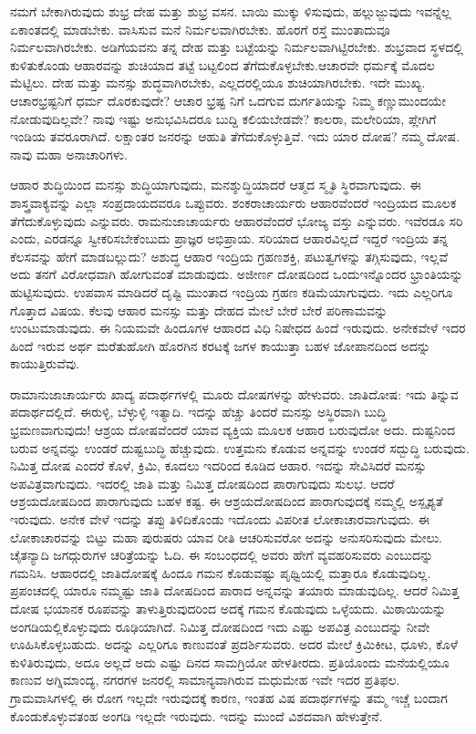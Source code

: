 ನಮಗೆ ಬೇಕಾಗಿರುವುದು ಶುಭ್ರ ದೇಹ ಮತ್ತು ಶುಭ್ರ ವಸನ. ಬಾಯಿ ಮುಕ್ಕು ಳಿಸುವುದು, ಹಲ್ಲುಜ್ಜುವುದು ಇವನ್ನೆಲ್ಲ ಏಕಾಂತದಲ್ಲಿ ಮಾಡಬೇಕು. ವಾಸಿಸುವ ಮನೆ ನಿರ್ಮಲವಾಗಿರಬೇಕು. ಹೊರಗೆ ರಸ್ತೆ ಮುಂತಾದುವೂ ನಿರ್ಮಲವಾಗಿರಬೇಕು. ಅಡಿಗೆ\break ಯವನು ತನ್ನ ದೇಹ ಮತ್ತು ಬಟ್ಟೆಯನ್ನು ನಿರ್ಮಲವಾಗಿಟ್ಟಿರಬೇಕು. ಶುಭ್ರವಾದ ಸ್ಥಳದಲ್ಲಿ ಕುಳಿತುಕೊಂಡು ಆಹಾರವನ್ನು ಶುಚಿಯಾದ ತಟ್ಟೆ ಬಟ್ಟಲಿಂದ ತೆಗೆದುಕೊಳ್ಳಬೇಕು.ಆಚಾರವೇ ಧರ್ಮಕ್ಕೆ ಮೊದಲ ಮೆಟ್ಟಿಲು. ದೇಹ ಮತ್ತು ಮನಸ್ಸು ಶುದ್ಧವಾಗಿರಬೇಕು, ಎಲ್ಲದರಲ್ಲಿಯೂ ಶುಚಿಯಾಗಿರಬೇಕು. ಇದೇ ಮುಖ್ಯ. ಆಚಾರಭ್ರಷ್ಟನಿಗೆ ಧರ್ಮ ದೊರಕುವುದೇ? ಆಚಾರ ಭ್ರಷ್ಟ ನಿಗೆ ಒದಗುವ ದುರ್ಗತಿಯನ್ನು ನಿಮ್ಮ ಕಣ್ಣುಮುಂದಯೇ ನೋಡುವುದಿಲ್ಲವೇ? ನಾವು ಇಷ್ಟು ಅನುಭವಿಸಿದರೂ ಬುದ್ದಿ ಕಲಿಯಬೇಡವೇ? ಕಾಲರಾ, ಮಲೇರಿಯಾ, ಪ್ಲೇಗಿಗೆ ಇಂಡಿಯ ತವರೂರಾಗಿದೆ. ಲಕ್ಷಾಂತರ ಜನರನ್ನು ಆಹುತಿ ತೆಗೆದುಕೊಳ್ಳುತ್ತಿವೆ. ಇದು ಯಾರ ದೋಷ? ನಮ್ಮ ದೋಷ. ನಾವು ಮಹಾ ಅನಾಚಾರಿಗಳು.

ಆಹಾರ ಶುದ್ಧಿಯಿಂದ ಮನಸ್ಸು ಶುದ್ಧಿಯಾಗುವುದು, ಮನಶ್ಶುದ್ಧಿಯಾದರೆ ಆತ್ಮದ ಸ್ಮೃತಿ ಸ್ಥಿರವಾಗುವುದು. ಈ ಶಾಸ್ತ್ರವಾಕ್ಯವನ್ನು ಎಲ್ಲಾ ಸಂಪ್ರದಾಯದವರೂ ಒಪ್ಪುವರು.\- ಶಂಕರಾಚಾರ್ಯರು ಆಹಾರವೆಂದರೆ ಇಂದ್ರಿಯದ ಮೂಲಕ ತೆಗೆದುಕೊಳ್ಳುವುದು ಎನ್ನುವರು. ರಾಮನುಜಾಚಾರ್ಯರು ಆಹಾರವೆಂದರೆ ಭೋಜ್ಯ ವಸ್ತು ಎನ್ನುವರು. ಇವೆರಡೂ ಸರಿ ಎಂದು, ಎರಡನ್ನೂ ಸ್ವೀಕರಿಸಬೇಕೆಂಬುದು ಪ್ರಾಜ್ಞರ ಅಭಿಪ್ರಾಯ. ಸರಿಯಾದ ಆಹಾರವಿಲ್ಲದೆ ಇದ್ದರೆ ಇಂದ್ರಿಯ ತನ್ನ ಕೆಲಸವನ್ನು ಹೇಗೆ ಮಾಡಬಲ್ಲುದು? ಅಶುದ್ಧ ಆಹಾರ ಇಂದ್ರಿಯ ಗ್ರಹಣಶಕ್ತಿ, ಪಟುತ್ವಗಳನ್ನು ತಗ್ಗಿಸುವುದು, ಇಲ್ಲವೆ ಅದು ತನಗೆ ವಿರೋಧವಾಗಿ ಹೋಗುವಂತೆ ಮಾಡುವುದು. ಅಜೀರ್ಣ ದೋಷದಿಂದ ಒಂದು\break ಇನ್ನೊಂದರ ಭ್ರಾಂತಿಯನ್ನು ಹುಟ್ಟಿಸುವುದು. ಉಪವಾಸ ಮಾಡಿದರೆ ದೃಷ್ಟಿ ಮುಂತಾದ ಇಂದ್ರಿಯ ಗ್ರಹಣ ಕಡಿಮೆಯಾಗುವುದು. ಇದು ಎಲ್ಲರಿಗೂ ಗೊತ್ತಾದ ವಿಷಯ. ಕೆಲವು ಆಹಾರ ಮನಸ್ಸು ಮತ್ತು ದೇಹದ ಮೇಲೆ ಬೇರೆ ಬೇರೆ ಪರಿಣಾಮವನ್ನು ಉಂಟುಮಾಡುವುದು. ಈ ನಿಯಮವೇ ಹಿಂದೂಗಳ ಆಹಾರದ ವಿಧಿ ನಿಷೇಧದ ಹಿಂದೆ ಇರುವುದು. ಅನೇಕವೇಳೆ ಇದರ ಹಿಂದೆ ಇರುವ ಅರ್ಥ ಮರೆತುಹೋಗಿ ಹೊರಗಿನ ಕರಟಕ್ಕೆ ಜಗಳ ಕಾಯುತ್ತಾ ಬಹಳ ಜೋಪಾನದಿಂದ ಅದನ್ನು ಕಾಯುತ್ತಿರುವೆವು.

ರಾಮಾನುಜಾಚಾರ್ಯರು ಖಾದ್ಯ ಪದಾರ್ಥಗಳಲ್ಲಿ ಮೂರು ದೋಷಗಳನ್ನು ಹೇಳುವರು. ಜಾತಿದೋಷ: ಇದು ತಿನ್ನುವ ಪದಾರ್ಥದಲ್ಲಿದೆ. ಈರುಳ್ಳಿ, ಬೆಳ್ಳುಳ್ಳಿ ಇತ್ಯಾದಿ. ಇದನ್ನು ಹೆಚ್ಚು ತಿಂದರೆ ಮನಸ್ಸು ಅಸ್ಥಿರವಾಗಿ ಬುದ್ಧಿ ಭ್ರಮಣವಾಗುವುದು! ಆಶ್ರಯ ದೋಷವೆಂದರೆ ಯಾವ ವ್ಯಕ್ತಿಯ ಮೂಲಕ ಆಹಾರ ಬರುವುದೋ ಅದು. ದುಷ್ಟನಿಂದ ಬರುವ ಅನ್ನವನ್ನು ಉಂಡರೆ ದುಷ್ಟಬುದ್ಧಿ ಹೆಚ್ಚುವುದು. ಉತ್ತಮನು ಕೊಡುವ ಅನ್ನವನ್ನು ಉಂಡರೆ ಸದ್ಬುದ್ಧಿ ಬರುವುದು. ನಿಮಿತ್ತ ದೋಷ ಎಂದರೆ ಕೊಳೆ, ಕ್ರಿಮಿ, ಕೂದಲು ಇದರಿಂದ ಕೂಡಿದ ಆಹಾರ. ಇದನ್ನು ಸೇವಿಸಿದರೆ ಮನಸ್ಸು ಅಪವಿತ್ರವಾಗುವುದು. ಇದರಲ್ಲಿ ಜಾತಿ ಮತ್ತು ನಿಮಿತ್ತ ದೋಷದಿಂದ ಪಾರಾಗುವುದು ಸುಲಭ. ಆದರೆ ಆಶ್ರಯದೋಷದಿಂದ ಪಾರಾಗುವುದು ಬಹಳ ಕಷ್ಟ. ಈ ಆಶ್ರಯದೋಷದಿಂದ ಪಾರಾಗುವುದಕ್ಕೆ ನಮ್ಮಲ್ಲಿ ಅಸ್ಪೃಶ್ಯತೆ ಇರುವುದು. ಅನೇಕ ವೇಳೆ ಇದನ್ನು ತಪ್ಪು ತಿಳಿದಿಕೊಂಡು ಇದೊಂದು ವಿಪರೀತ ಲೋಕಾಚಾರವಾಗುವುದು. ಈ ಲೋಕಾಚಾರವನ್ನು ಬಿಟ್ಟು ಮಹಾ ಪುರುಷರು ಯಾವ ರೀತಿ ಆಚರಿಸುವರೋ ಅದನ್ನು ಅನುಸರಿಸುವುದು ಮೇಲು. ಚೈತನ್ಯಾದಿ ಜಗದ್ಗುರುಗಳ ಚರಿತ್ರೆಯನ್ನು ಓದಿ. ಈ ಸಂಬಂಧದಲ್ಲಿ ಅವರು ಹೇಗೆ ವ್ಯವಹರಿಸುವರು ಎಂಬುದನ್ನು ಗಮನಿಸಿ. ಆಹಾರದಲ್ಲಿ ಜಾತಿದೋಷಕ್ಕೆ ಹಿಂದೂ ಗಮನ ಕೊಡುವಷ್ಟು ಪೃಥ್ವಿಯಲ್ಲಿ ಮತ್ತಾರೂ ಕೊಡುವುದಿಲ್ಲ. ಪ್ರಪಂಚದಲ್ಲಿ ಯಾರೂ ನಮ್ಮಷ್ಟು ಜಾತಿ ದೋಷದಿಂದ ಪಾರಾದ ಅನ್ನವನ್ನು ತಯಾರು ಮಾಡುವುದಿಲ್ಲ. ಆದರೆ ನಿಮಿತ್ತ ದೋಷ ಭಯಾನಕ ರೂಪವನ್ನು ತಾಳುತ್ತಿರುವುದರಿಂದ ಅದಕ್ಕೆ ಗಮನ ಕೊಡುವುದು ಒಳ್ಳೆಯದು. ಮಿಠಾಯಿಯನ್ನು ಅಂಗಡಿಯಲ್ಲಿಕೊಳ್ಳುವುದು ರೂಢಿಯಾಗಿದೆ. ನಿಮಿತ್ತ ದೋಷದಿಂದ ಇದು ಎಷ್ಟು ಅಪವಿತ್ರ ಎಂಬುದನ್ನು ನೀವೇ ಊಹಿಸಿಕೊಳ್ಳಬಹುದು. ಅದನ್ನು ಎಲ್ಲರಿಗೂ ಕಾಣುವಂತೆ ಪ್ರದರ್ಶಿಸುವರು. ಅದರ ಮೇಲೆ ಕ್ರಿಮಿಕೀಟ, ಧೂಳು, ಕೊಳೆ ಕುಳಿತಿರುವುದು, ಅದೂ ಅಲ್ಲದೆ ಅದು ಎಷ್ಟು ದಿನದ ಸಾಮಗ್ರಿಯೋ ಹೇಳತೀರದು. ಪ್ರತಿಯೊಂದು ಮನೆಯಲ್ಲಿಯೂ ಕಾಣುವ ಅಗ್ನಿಮಾಂದ್ಯ, ನಗರಗಳ ಜನರಲ್ಲಿ ಸಾಮಾನ್ಯವಾಗಿರುವ ಮಧುಮೇಹ ಇವೇ ಇದರ ಪ್ರತಿಫಲ. ಗ್ರಾಮವಾಸಿಗಳಲ್ಲಿ ಈ ರೋಗ ಇಲ್ಲದೇ ಇರುವುದಕ್ಕೆ ಕಾರಣ, ಇಂತಹ ವಿಷ ಪದಾರ್ಥಗಳನ್ನು ತಮ್ಮ ಇಚ್ಚೆ ಬಂದಾಗ ಕೊಂಡುಕೊಳ್ಳುವತಂಹ ಅಂಗಡಿ ಇಲ್ಲದೇ ಇರುವುದು. ಇದನ್ನು ಮುಂದೆ ವಿಶದವಾಗಿ ಹೇಳುತ್ತೇನೆ.

